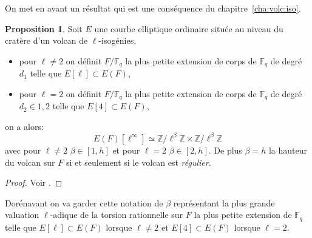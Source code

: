 \documentclass[10pt,a4paper]{book}
\theoremstyle{plain}
\theoremstyle{definition}
\theoremstyle{definition}
\theoremstyle{definition}
\newtheorem{prop}[thm]{Proposition}
\theoremstyle{definition}
\theoremstyle{remark}
\theoremstyle{remark}
\theoremstyle{definition}
\begin{document}
On met en avant un résultat qui est une conséquence du 
chapitre~\ref{cha:volc:iso}. 

\begin{prop}
\label{pro:atk:d1}
Soit $E$ une courbe elliptique ordinaire située au niveau du cratère d'un 
volcan de $\ell$-isogénies,
\begin{itemize}
\item pour $\ell \neq 2$ on définit $F/\mathbb{F}_q$ la 
plus petite extension de corps de $\mathbb{F}_q$ de degré $d_1$ telle que 
$E[\ell] \subset E(F)$,
\item pour $\ell=2$ on définit $F/\mathbb{F}_q$ la 
plus petite extension de corps de $\mathbb{F}_q$ de degré $d_2 \in {1,2}$ telle
que $E[4] \subset E(F)$,
\end{itemize}
on a alors:
\[
E(F)[\ell^{\infty}] \simeq \mathbb{Z}/ \ell^{\beta} \mathbb{Z} \times \mathbb{Z}/ \ell^{\beta} \mathbb{Z} 
\]
avec pour $\ell \neq 2$ $\beta \in [1,h]$ et pour $\ell=2$ $\beta \in [2,h]$. De 
plus $\beta=h$ la hauteur du volcan sur $F$ si et seulement si le volcan est \emph{régulier}.
\end{prop}

\begin{proof}
Voir \cite[§5.3.1]{Ionica2010}.
\end{proof}

Dorénavant on va garder cette notation de $\beta$ représentant la plus grande 
valuation $\ell$-adique de la torsion rationnelle sur $F$ la plus petite 
extension de  $\mathbb{F}_q$ telle que $E[\ell] \subset E(F)$ lorsque $\ell 
\neq 2$ et $E[4] \subset E(F)$ lorsque $\ell = 2$.
\end{document}
